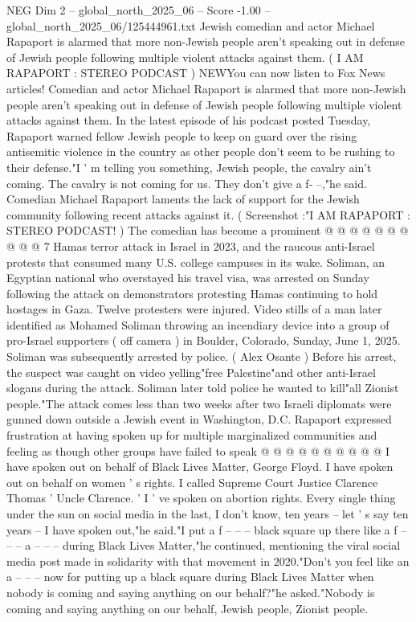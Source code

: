 \begin{textsample}{NEG Dim 2 – global\_north\_2025\_06 – Score -1.00 – global\_north\_2025\_06/125444961.txt}  \label{ex:f2_neg_219}
Jewish comedian and actor Michael Rapaport is alarmed that more non-Jewish people aren't speaking out in defense of Jewish people following multiple violent attacks against them. ( I AM RAPAPORT : STEREO PODCAST ) NEWYou can now listen to Fox News articles!
Comedian and actor Michael Rapaport is alarmed that more non-Jewish people aren't speaking out in defense of Jewish people following multiple violent attacks against them.
In the latest episode of his podcast posted Tuesday, Rapaport warned fellow Jewish people to keep on guard over the rising antisemitic violence in the country as other people don't seem to be rushing to their defense."I ' m telling you something, Jewish people, the cavalry ain't coming.
The cavalry is not coming for us.
They don't give a f- --,"he said.
Comedian Michael Rapaport laments the lack of support for the Jewish community following recent attacks against it. ( Screenshot :"I AM RAPAPORT : STEREO PODCAST! ) The comedian has become a prominent @ @ @ @ @ @ @ @ @ @ 7 Hamas terror attack in Israel in 2023, and the raucous anti-Israel protests that consumed many U.S. college campuses in its wake.
Soliman, an Egyptian national who overstayed his travel visa, was arrested on Sunday following the attack on demonstrators protesting Hamas continuing to hold hostages in Gaza.
Twelve protesters were injured.
Video stills of a man later identified as Mohamed Soliman throwing an incendiary device into a group of pro-Israel supporters ( off camera ) in Boulder, Colorado, Sunday, June 1, 2025.
Soliman was subsequently arrested by police. ( Alex Osante ) Before his arrest, the suspect was caught on video yelling"free Palestine"and other anti-Israel slogans during the attack.
Soliman later told police he wanted to kill"all Zionist people."The attack comes less than two weeks after two Israeli diplomats were gunned down outside a Jewish event in Washington, D.C.
Rapaport expressed frustration at having spoken up for multiple marginalized communities and feeling as though other groups have failed to speak @ @ @ @ @ @ @ @ @ @ I have spoken out on behalf of Black Lives Matter, George Floyd.
I have spoken out on behalf on women ' s rights.
I called Supreme Court Justice Clarence Thomas ' Uncle Clarence. ' I ' ve spoken on abortion rights.
Every single thing under the sun on social media in the last, I don't know, ten years -- let ' s say ten years -- I have spoken out,"he said."I put a f -- -- -- black square up there like a f -- -- -- a -- -- -- during Black Lives Matter,"he continued, mentioning the viral social media post made in solidarity with that movement in 2020."Don't you feel like an a -- -- -- now for putting up a black square during Black Lives Matter when nobody is coming and saying anything on our behalf?"he asked."Nobody is coming and saying anything on our behalf, Jewish people, Zionist people.

\end{textsample}
